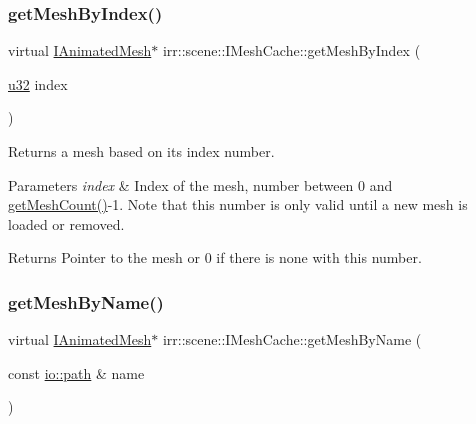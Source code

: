 \subsubsection{\texorpdfstring{get\+Mesh\+By\+Index()}{getMeshByIndex()}\hspace{0.1cm}{\footnotesize\ttfamily [2/2]}}
{\footnotesize\ttfamily virtual \hyperlink{classirr_1_1scene_1_1IAnimatedMesh}{I\+Animated\+Mesh}$\ast$ irr\+::scene\+::\+I\+Mesh\+Cache\+::get\+Mesh\+By\+Index (\begin{DoxyParamCaption}\item[{\hyperlink{namespaceirr_a0416a53257075833e7002efd0a18e804}{u32}}]{index }\end{DoxyParamCaption})\hspace{0.3cm}{\ttfamily [pure virtual]}}



Returns a mesh based on its index number. 


\begin{DoxyParams}{Parameters}
{\em index} & Index of the mesh, number between 0 and \hyperlink{classirr_1_1scene_1_1IMeshCache_a9dc99e46309a6ef494ef7672c9b49853}{get\+Mesh\+Count()}-\/1. Note that this number is only valid until a new mesh is loaded or removed. \\
\hline
\end{DoxyParams}
\begin{DoxyReturn}{Returns}
Pointer to the mesh or 0 if there is none with this number. 
\end{DoxyReturn}
\mbox{\label{classirr_1_1scene_1_1IMeshCache_a4c93e736bdca8c84d478afc82540d6bb}} 
\subsubsection{\texorpdfstring{get\+Mesh\+By\+Name()}{getMeshByName()}\hspace{0.1cm}{\footnotesize\ttfamily [1/2]}}
{\footnotesize\ttfamily virtual \hyperlink{classirr_1_1scene_1_1IAnimatedMesh}{I\+Animated\+Mesh}$\ast$ irr\+::scene\+::\+I\+Mesh\+Cache\+::get\+Mesh\+By\+Name (\begin{DoxyParamCaption}\item[{const \hyperlink{namespaceirr_1_1io_a6468281622ce3a1c46b72e19f32dded5}{io\+::path} \&}]{name }\end{DoxyParamCaption})\hspace{0.3cm}{\ttfamily [pure virtual]}}



